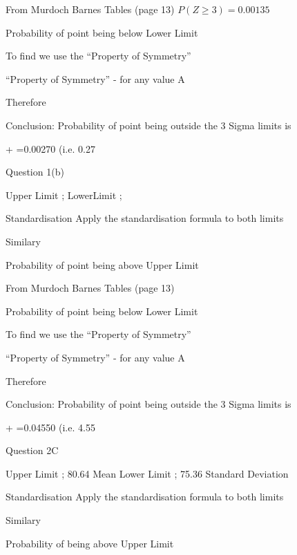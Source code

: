 \documentclass[a4]{beamer}
\begin{document}
From Murdoch Barnes Tables (page 13)  $P(Z \geq 3)=0.00135$

Probability of point being below Lower Limit


To find   we use the “Property of Symmetry”

“Property of Symmetry” -   for any value A
							
Therefore 

Conclusion: 
Probability of point being outside the 3 Sigma limits is

 + =0.00270 	(i.e. 0.27%
















Question 1(b)

Upper Limit ;  
LowerLimit ;  

Standardisation
Apply the standardisation formula	 	to both limits

 
Similary

 

Probability of point being above Upper Limit

From Murdoch Barnes Tables (page 13)  

Probability of point being below Lower Limit


To find   we use the “Property of Symmetry”

“Property of Symmetry” -   for any value A
							
Therefore 

Conclusion: 
Probability of point being outside the 3 Sigma limits is

 + =0.04550 	(i.e. 4.55%
















Question 2C

Upper Limit ; 80.64		Mean		 	
Lower Limit ; 75.36		Standard Deviation	 

Standardisation
Apply the standardisation formula	 	to both limits

 
Similary

 

Probability of being above Upper Limit
\end{document}
